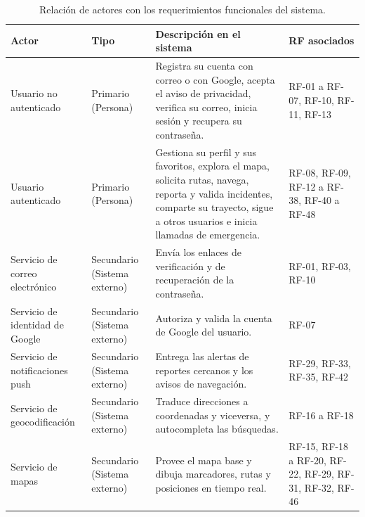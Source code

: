 \begin{table}[htbp]
\centering
\caption{Relación de actores con los requerimientos funcionales del sistema.}
\label{tab:actores_sistema}
\footnotesize
\begin{tabular}{L{3.0cm} L{2.0cm} p{5.6cm} L{2.7cm}}
\hline
\textbf{Actor} & \textbf{Tipo} & \textbf{Descripción en el sistema} & \textbf{RF asociados} \\
\hline
Usuario no autenticado & Primario (Persona) & Registra su cuenta con correo o con Google, acepta el aviso de privacidad, verifica su correo, inicia sesión y recupera su contraseña. & RF-01 a RF-07, RF-10, RF-11, RF-13 \\
\hline
Usuario autenticado & Primario (Persona) & Gestiona su perfil y sus favoritos, explora el mapa, solicita rutas, navega, reporta y valida incidentes, comparte su trayecto, sigue a otros usuarios e inicia llamadas de emergencia. & RF-08, RF-09, RF-12 a RF-38, RF-40 a RF-48 \\
\hline
Servicio de correo electrónico & Secundario (Sistema externo) & Envía los enlaces de verificación y de recuperación de la contraseña. & RF-01, RF-03, RF-10 \\
\hline
Servicio de identidad de Google & Secundario (Sistema externo) & Autoriza y valida la cuenta de Google del usuario. & RF-07 \\
\hline
Servicio de notificaciones push & Secundario (Sistema externo) & Entrega las alertas de reportes cercanos y los avisos de navegación. & RF-29, RF-33, RF-35, RF-42 \\
\hline
Servicio de geocodificación & Secundario (Sistema externo) & Traduce direcciones a coordenadas y viceversa, y autocompleta las búsquedas. & RF-16 a RF-18 \\
\hline
Servicio de mapas & Secundario (Sistema externo) & Provee el mapa base y dibuja marcadores, rutas y posiciones en tiempo real. & RF-15, RF-18 a RF-20, RF-22, RF-29, RF-31, RF-32, RF-46 \\
\hline
\end{tabular}
\end{table}
